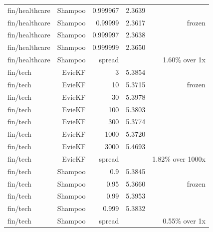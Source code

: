 \begin{table}[t]
\begin{tabular}{lrrrr}
fin/healthcare & Shampoo & 0.999967 & 2.3639 &  \\
fin/healthcare & Shampoo & 0.99999 & 2.3617 & frozen \\
fin/healthcare & Shampoo & 0.999997 & 2.3638 &  \\
fin/healthcare & Shampoo & 0.999999 & 2.3650 &  \\
fin/healthcare & Shampoo & spread &  & 1.60\% over 1x \\
fin/tech & EvieKF & 3 & 5.3854 &  \\
fin/tech & EvieKF & 10 & 5.3715 & frozen \\
fin/tech & EvieKF & 30 & 5.3978 &  \\
fin/tech & EvieKF & 100 & 5.3803 &  \\
fin/tech & EvieKF & 300 & 5.3774 &  \\
fin/tech & EvieKF & 1000 & 5.3720 &  \\
fin/tech & EvieKF & 3000 & 5.4693 &  \\
fin/tech & EvieKF & spread &  & 1.82\% over 1000x \\
fin/tech & Shampoo & 0.9 & 5.3845 &  \\
fin/tech & Shampoo & 0.95 & 5.3660 & frozen \\
fin/tech & Shampoo & 0.99 & 5.3953 &  \\
fin/tech & Shampoo & 0.999 & 5.3832 &  \\
fin/tech & Shampoo & spread &  & 0.55\% over 1x \\
\bottomrule
\end{tabular}
\end{table}
